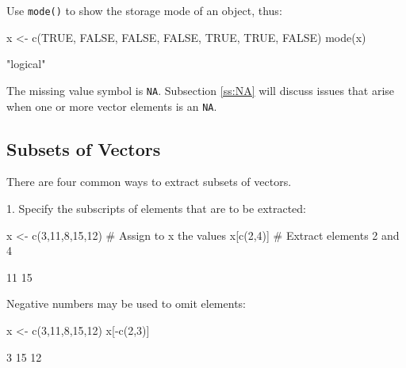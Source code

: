 \documentclass{tufte-book}\usepackage[]{graphicx}\usepackage[]{color}
\newcommand{\txtt}[1]{\texttt{#1}}
\begin{document}
Use \txtt{mode()} to show the storage mode of an object, thus:
\begin{Schunk}
\begin{Sinput}
x <- c(TRUE, FALSE, FALSE, FALSE, TRUE, TRUE, FALSE)
mode(x)
\end{Sinput}
\begin{Soutput}
[1] "logical"
\end{Soutput}
\end{Schunk}

The missing value symbol is \txtt{NA}.  Subsection \ref{ss:NA} will
discuss issues that arise when one or more vector elements is an \txtt{NA}.

\subsection*{Subsets of Vectors}
There are four common ways to extract subsets of vectors.

1. Specify the subscripts of elements that are to be extracted:
\begin{Schunk}
\begin{Sinput}
x <- c(3,11,8,15,12)   # Assign to x the values
x[c(2,4)]              # Extract elements 2 and 4
\end{Sinput}
\begin{Soutput}
[1] 11 15
\end{Soutput}
\end{Schunk}
\noindent
Negative numbers may be used to omit elements:
\begin{Schunk}
\begin{Sinput}
x <- c(3,11,8,15,12)
x[-c(2,3)]
\end{Sinput}
\begin{Soutput}
[1]  3 15 12
\end{Soutput}
\end{Schunk}
\end{document}

